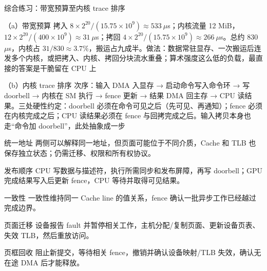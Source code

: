 \begin{chapteranswer}{综合练习：带宽预算至内核 trace 排序}
\begin{answersubproblem}{（a）带宽预算}
拷入 $8\times2^{20}/(15.75\times10^{9})\approx533\ \mu$s；内核流量 12 MiB，$12\times2^{20}/(400\times10^{9})\approx31\ \mu$s；拷回 $4\times2^{20}/(15.75\times10^{9})\approx266\ \mu$s。总约 830 $\mu$s，内核占 $31/830\approx3.7\%$，搬运占九成半。做法：数据常驻显存、一次搬运后连发多个内核，或把拷入、内核、拷回分块流水重叠；算术强度这么低的负载，最直接的答案是干脆留在 CPU 上
\end{answersubproblem}
\begin{answersubproblem}{（b）内核 trace 排序}
次序：输入 DMA 入显存 → 启动命令写入命令环 → 写 doorbell → 内核在 SM 执行 → fence 更新 → 结果 DMA 回主存 → CPU 读结果。三处硬性约定：doorbell 必须在命令可见之后（先可见、再通知）；fence 必须在内核完成之后；CPU 读结果必须在 fence 与回拷完成之后。输入拷贝本身也走“命令加 doorbell”，此处抽象成一步
\end{answersubproblem}
\end{chapteranswer}

\begin{chapteranswer}{统一地址}
两侧可以解释同一地址，但页面可能位于不同介质，Cache 和 TLB 也保存独立状态；仍需迁移、权限和所有权协议。
\end{chapteranswer}

\begin{chapteranswer}{发布顺序}
CPU 写数据与描述符，执行所需同步和发布屏障，再写 doorbell；GPU 完成结果写入后更新 fence，CPU 等待并取得可见结果。
\end{chapteranswer}

\begin{chapteranswer}{一致性}
一致性维持同一 Cache line 的值关系，fence 确认一批异步工作已经越过完成边界。
\end{chapteranswer}

\begin{chapteranswer}{页面迁移}
设备报告 fault 并暂停相关工作，主机分配/复制页面、更新设备页表、失效 TLB，然后重放访问。
\end{chapteranswer}

\begin{chapteranswer}{页框回收}
阻止新提交，等待相关 fence，撤销并确认设备映射/TLB 失效，确认无在途 DMA 后才能释放。
\end{chapteranswer}

